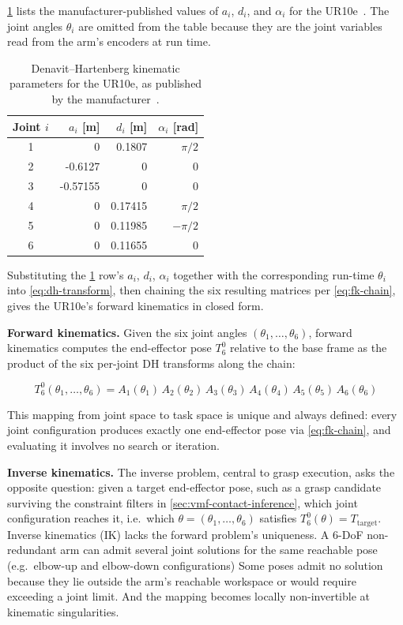 \documentclass[oneside,studentpaper]{wbk}
\begin{document}
\cref{tab:ur10e-dh-parameters} lists the manufacturer-published values of $a_i$, $d_i$, and $\alpha_i$ for the UR10e~\cite{universalrobots2024dh}. The joint angles $\theta_i$ are omitted from the table because they are the joint variables read from the arm's encoders at run time.

\begin{table}[htbp]
  \centering
  \caption{Denavit--Hartenberg kinematic parameters for the UR10e, as published by the manufacturer~\cite{universalrobots2024dh}.}
  \label{tab:ur10e-dh-parameters}
  \begin{tabular}{crrr}
    \toprule
    Joint $i$ & $a_i$ [m] & $d_i$ [m] & $\alpha_i$ [rad] \\
    \midrule
    1 & 0        & 0.1807  & $\pi/2$  \\
    2 & -0.6127  & 0       & 0        \\
    3 & -0.57155 & 0       & 0        \\
    4 & 0        & 0.17415 & $\pi/2$  \\
    5 & 0        & 0.11985 & $-\pi/2$ \\
    6 & 0        & 0.11655 & 0        \\
    \bottomrule
  \end{tabular}
\end{table}

Substituting the \cref{tab:ur10e-dh-parameters} row's $a_i$, $d_i$, $\alpha_i$ together with the corresponding run-time $\theta_i$ into \cref{eq:dh-transform}, then chaining the six resulting matrices per \cref{eq:fk-chain}, gives the UR10e's forward kinematics in closed form.

\textbf{Forward kinematics.} Given the six joint angles $(\theta_1, \dots, \theta_6)$, forward kinematics computes the end-effector pose $T_6^0$ relative to the base frame as the product of the six per-joint DH transforms along the chain:

\begin{equation}\label{eq:fk-chain}
  T_6^0(\theta_1, \dots, \theta_6) = A_1(\theta_1)\,A_2(\theta_2)\,A_3(\theta_3)\,A_4(\theta_4)\,A_5(\theta_5)\,A_6(\theta_6)
\end{equation}

This mapping from joint space to task space is unique and always defined: every joint configuration produces exactly one end-effector pose via \cref{eq:fk-chain}, and evaluating it involves no search or iteration.

\textbf{Inverse kinematics.} The inverse problem, central to grasp execution, asks the opposite question: given a target end-effector pose, such as a grasp candidate surviving the constraint filters in \cref{sec:vmf-contact-inference}, which joint configuration reaches it, i.e.\ which $\theta = (\theta_1, \dots, \theta_6)$ satisfies $T_6^0(\theta) = T_{\mathrm{target}}$. Inverse kinematics (IK) lacks the forward problem's uniqueness. A 6-DoF non-redundant arm can admit several joint solutions for the same reachable pose (e.g.\ elbow-up and elbow-down configurations) Some poses admit no solution because they lie outside the arm's reachable workspace or would require exceeding a joint limit. And the mapping becomes locally non-invertible at kinematic singularities.
\end{document}

